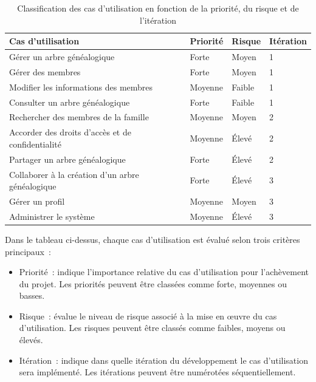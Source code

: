 \begin{table}[htbp]
  \centering
  \begin{tabularx}{\textwidth}{|l|l|l|X|}
    \hline
    \textbf{Cas d'utilisation} & \textbf{Priorité} & \textbf{Risque} & \textbf{Itération} \\ \hline
    Gérer un arbre généalogique & Forte & Moyen & 1 \\ \hline
    Gérer des membres & Forte & Moyen & 1 \\ \hline
    Modifier les informations des membres & Moyenne & Faible & 1 \\ \hline
    Consulter un arbre généalogique & Forte & Faible & 1 \\ \hline
    Rechercher des membres de la famille & Moyenne & Moyen & 2 \\ \hline
    Accorder des droits d’accès et de confidentialité & Moyenne & Élevé & 2 \\ \hline
    Partager un arbre généalogique & Forte & Élevé & 2 \\ \hline
    Collaborer à la création d’un arbre généalogique & Forte & Élevé & 3 \\ \hline
    Gérer un profil & Moyenne & Moyen & 3 \\ \hline
    Administrer le système & Moyenne & Élevé & 3 \\ \hline
  \end{tabularx}
  \caption{Classification des cas d'utilisation en fonction de la priorité, du risque et de l'itération}
\end{table}

Dans le tableau ci-dessus, chaque cas d’utilisation est évalué selon trois critères principaux :

\begin{itemize}

  \item Priorité : indique l’importance relative du cas d’utilisation pour
    l’achèvement du projet. Les priorités peuvent être classées comme forte, moyennes ou basses.

  \item Risque : évalue le niveau de risque associé à la mise en œuvre du cas
    d’utilisation. Les risques peuvent être classés comme faibles, moyens ou élevés.

  \item Itération : indique dans quelle itération du développement le cas
    d’utilisation sera implémenté. Les itérations peuvent être numérotées séquentiellement.

\end{itemize}


